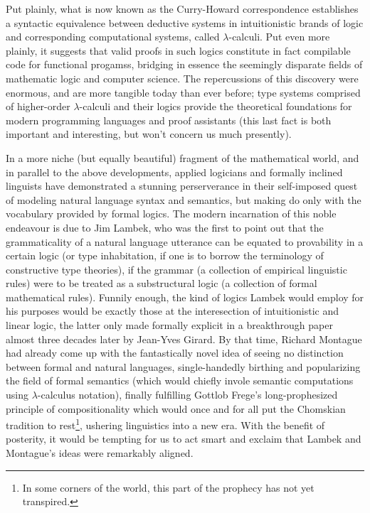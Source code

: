 Put plainly, what is now known as the Curry-Howard correspondence establishes a syntactic equivalence between deductive systems in intuitionistic brands of logic and corresponding computational systems, called $\lambda$-calculi.
Put even more plainly, it suggests that valid proofs in such logics constitute in fact compilable code for functional progamss, bridging in essence the seemingly disparate fields of mathematic logic and computer science.
The repercussions of this discovery were enormous, and are more tangible today than ever before; type systems comprised of higher-order $\lambda$-calculi and their logics provide the theoretical foundations for modern programming languages and proof assistants (this last fact is both important and interesting, but won't concern us much presently).

In a more niche (but equally beautiful) fragment of the mathematical world, and in parallel to the above developments, applied logicians and formally inclined linguists have demonstrated a stunning perserverance in their self-imposed quest of modeling natural language syntax and semantics, but making do only with the vocabulary provided by formal logics.
The modern incarnation of this noble endeavour is due to Jim Lambek, who was the first to point out that the grammaticality of a natural language utterance can be equated to provability in a certain logic (or type inhabitation, if one is to borrow the terminology of constructive type theories), if the grammar (a collection of empirical linguistic rules) were to be treated as a substructural logic (a collection of formal mathematical rules).
Funnily enough, the kind of logics Lambek would employ for his purposes would be exactly those at the interesection of intuitionistic and linear logic, the latter only made formally explicit in a breakthrough paper almost three decades later by Jean-Yves Girard.
By that time, Richard Montague had already come up with the fantastically novel idea of seeing no distinction between formal and natural languages, single-handedly birthing and popularizing the field of formal semantics (which would chiefly invole semantic computations using $\lambda$-calculus notation), finally fulfilling Gottlob Frege's long-prophesized principle of compositionality which would once and for all put the Chomskian tradition to rest\footnote{In some corners of the world, this part of the prophecy has not yet transpired.}, ushering linguistics into a new era.
With the benefit of posterity, it would be tempting for us to act smart and exclaim that Lambek and Montague's ideas were remarkably aligned. 
